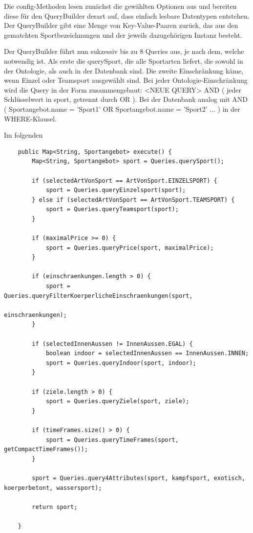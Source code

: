Die config-Methoden lesen zunächst die gewählten Optionen aus und bereiten diese für den QueryBuilder derart auf, dass einfach lesbare Datentypen entstehen. Der QueryBuilder gibt eine Menge von Key-Value-Paaren zurück, das aus den gematchten Sportbezeichnungen und der jeweils dazugehörigen Instanz besteht.

Der QueryBuilder führt nun sukzessiv bis zu 8 Queries aus, je nach dem, welche notwendig ist. Als erste die querySport, die alle Sportarten liefert, die sowohl in der Ontologie, als auch in der Datenbank sind. Die zweite Einschränkung käme, wenn Einzel oder Teamsport ausgewählt sind. Bei jeder Ontologie-Einschränkung wird die Query in der Form zusammengebaut: <NEUE QUERY> AND ( jeder Schlüsselwert in sport, getrennt durch OR ). Bei der Datenbank analog mit AND ( Sportangebot.name = 'Sport1' OR Sportangebot.name = 'Sport2' ... ) in der WHERE-Klausel.

Im folgenden 

		


\begin{lstlisting}
    public Map<String, Sportangebot> execute() {
        Map<String, Sportangebot> sport = Queries.querySport();

        if (selectedArtVonSport == ArtVonSport.EINZELSPORT) {
            sport = Queries.queryEinzelsport(sport);
        } else if (selectedArtVonSport == ArtVonSport.TEAMSPORT) {
            sport = Queries.queryTeamsport(sport);
        }

        if (maximalPrice >= 0) {
            sport = Queries.queryPrice(sport, maximalPrice);
        }

        if (einschraenkungen.length > 0) {
            sport = Queries.queryFilterKoerperlicheEinschraenkungen(sport,
                                                                   einschraenkungen);
        }

        if (selectedInnenAussen != InnenAussen.EGAL) {
            boolean indoor = selectedInnenAussen == InnenAussen.INNEN;
            sport = Queries.queryIndoor(sport, indoor);
        }

        if (ziele.length > 0) {
            sport = Queries.queryZiele(sport, ziele);
        }

        if (timeFrames.size() > 0) {
            sport = Queries.queryTimeFrames(sport, getCompactTimeFrames());
        }

        sport = Queries.query4Attributes(sport, kampfsport, exotisch, koerperbetont, wassersport);

        return sport;

    }

\end{lstlisting}


